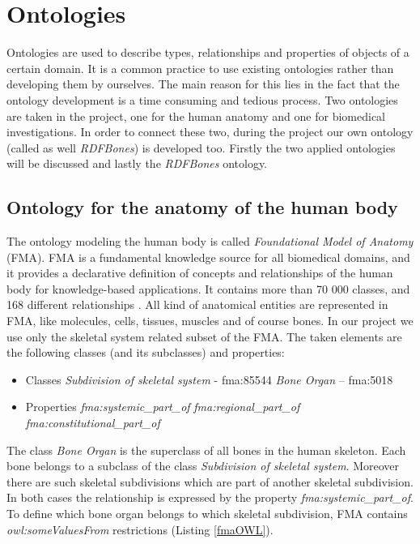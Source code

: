 \newpage
\section{Ontologies} \label{22}

Ontologies are used to describe types, relationships and properties of objects of a certain domain. It is a common practice to use existing ontologies rather than developing them by ourselves. The main reason for this lies in the fact that the ontology development is a time consuming and tedious process. Two ontologies are taken in the project, one for the human anatomy and one for biomedical investigations. In order to connect these two, during the project our own ontology (called as well \textit{RDFBones}) is developed too. Firstly the two applied ontologies will be discussed and lastly the \textit{RDFBones} ontology.

\subsection{Ontology for the anatomy of the human body}  \label{fma}

The ontology modeling the human body is called \textit{Foundational Model of Anatomy} (FMA). FMA is a fundamental knowledge source for all biomedical domains, and it provides a declarative definition of concepts and relationships of the human body for knowledge-based applications. It contains more than 70 000 classes, and 168 different relationships \cite{Rosse2003478}. All kind of anatomical entities are represented in FMA, like molecules, cells, tissues, muscles and of course bones. In our project we use only the skeletal system related subset of the FMA. The taken elements are the following classes (and its subclasses) and properties: 

\begin{itemize}
	\item{Classes}
		\subitem \textit{Subdivision of skeletal system} - fma:85544 
		\subitem \textit{Bone Organ} – fma:5018
\end{itemize}

\begin{itemize}
	\item{Properties}
		\subitem \textit{fma:systemic\_part\_of}
		\subitem \textit{fma:regional\_part\_of}
		\subitem \textit{fma:constitutional\_part\_of}
\end{itemize}

The class \textit{Bone Organ} is the superclass of all bones in the human skeleton. Each bone belongs to a subclass of  the class \textit{Subdivision of skeletal system}. Moreover there are such skeletal subdivisions which are part of another skeletal subdivision. In both cases the relationship is expressed by the property \textit{fma:systemic\_part\_of}. To define which bone organ belongs to which skeletal subdivision, FMA contains \textit{owl:someValuesFrom} restrictions (Listing \ref{fmaOWL}).

